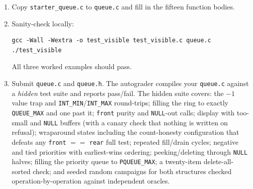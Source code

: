 \documentclass[11pt]{article}
\begin{document}
\begin{enumerate}
  \item Copy \texttt{starter\_queue.c} to \texttt{queue.c} and fill in the fifteen function bodies.
  \item Sanity-check locally:
\begin{verbatim}
gcc -Wall -Wextra -o test_visible test_visible.c queue.c
./test_visible
\end{verbatim}
    All three worked examples should pass.
  \item Submit \texttt{queue.c} and \texttt{queue.h}. The autograder compiles your \texttt{queue.c} against a \emph{hidden} test suite and reports pass/fail. The hidden suite covers: the $-1$ value trap and \texttt{INT\_MIN}/\texttt{INT\_MAX} round-trips; filling the ring to exactly \texttt{QUEUE\_MAX} and one past it; \texttt{front} purity and \texttt{NULL}-out calls; display with too-small and \texttt{NULL} buffers (with a canary check that nothing is written on refusal); wraparound states including the count-honesty configuration that defeats any \texttt{front} $==$ \texttt{rear} full test; repeated fill/drain cycles; negative and tied priorities with earliest-wins ordering; peeking/deleting through \texttt{NULL} halves; filling the priority queue to \texttt{PQUEUE\_MAX}; a twenty-item delete-all-sorted check; and seeded random campaigns for both structures checked operation-by-operation against independent oracles.
\end{enumerate}
\end{document}
